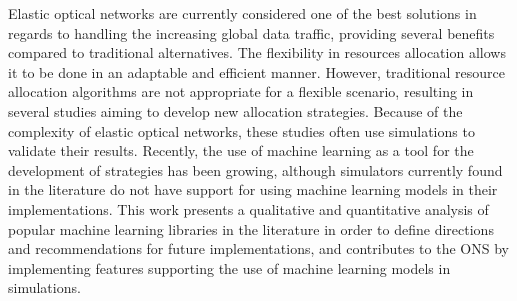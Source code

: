 Elastic optical networks are currently considered one of the best solutions in regards to handling the increasing global data traffic, providing several benefits compared to traditional alternatives. The flexibility in resources allocation allows it to be done in an adaptable and efficient manner. However, traditional resource allocation algorithms are not appropriate for a flexible scenario, resulting in several studies aiming to develop new allocation strategies. Because of the complexity of elastic optical networks, these studies often use simulations to validate their results. Recently, the use of machine learning as a tool for the development of strategies has been growing, although simulators currently found in the literature do not have support for using machine learning models in their implementations. This work presents a qualitative and quantitative analysis of popular machine learning libraries in the literature in order to define directions and recommendations for future implementations, and contributes to the \acrfull{ONS} by implementing features supporting the use of machine learning models in simulations.